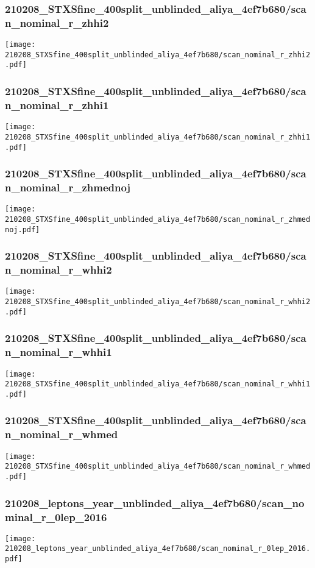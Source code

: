 \begin{frame}
   \frametitle{\small 210208\_STXSfine\_400split\_unblinded\_aliya\_4ef7b680/scan\_nominal\_r\_zhhi2}
   \centering
   \texttt{[image: 210208\_STXSfine\_400split\_unblinded\_aliya\_4ef7b680/scan\_nominal\_r\_zhhi2.pdf]}
\end{frame}

\begin{frame}
   \frametitle{\small 210208\_STXSfine\_400split\_unblinded\_aliya\_4ef7b680/scan\_nominal\_r\_zhhi1}
   \centering
   \texttt{[image: 210208\_STXSfine\_400split\_unblinded\_aliya\_4ef7b680/scan\_nominal\_r\_zhhi1.pdf]}
\end{frame}

\begin{frame}
   \frametitle{\small 210208\_STXSfine\_400split\_unblinded\_aliya\_4ef7b680/scan\_nominal\_r\_zhmednoj}
   \centering
   \texttt{[image: 210208\_STXSfine\_400split\_unblinded\_aliya\_4ef7b680/scan\_nominal\_r\_zhmednoj.pdf]}
\end{frame}

\begin{frame}
   \frametitle{\small 210208\_STXSfine\_400split\_unblinded\_aliya\_4ef7b680/scan\_nominal\_r\_whhi2}
   \centering
   \texttt{[image: 210208\_STXSfine\_400split\_unblinded\_aliya\_4ef7b680/scan\_nominal\_r\_whhi2.pdf]}
\end{frame}

\begin{frame}
   \frametitle{\small 210208\_STXSfine\_400split\_unblinded\_aliya\_4ef7b680/scan\_nominal\_r\_whhi1}
   \centering
   \texttt{[image: 210208\_STXSfine\_400split\_unblinded\_aliya\_4ef7b680/scan\_nominal\_r\_whhi1.pdf]}
\end{frame}

\begin{frame}
   \frametitle{\small 210208\_STXSfine\_400split\_unblinded\_aliya\_4ef7b680/scan\_nominal\_r\_whmed}
   \centering
   \texttt{[image: 210208\_STXSfine\_400split\_unblinded\_aliya\_4ef7b680/scan\_nominal\_r\_whmed.pdf]}
\end{frame}

\begin{frame}
   \frametitle{\small 210208\_leptons\_year\_unblinded\_aliya\_4ef7b680/scan\_nominal\_r\_0lep\_2016}
   \centering
   \texttt{[image: 210208\_leptons\_year\_unblinded\_aliya\_4ef7b680/scan\_nominal\_r\_0lep\_2016.pdf]}
\end{frame}

